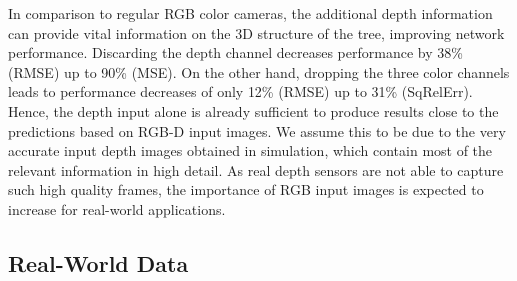 In comparison to regular RGB color cameras, the additional depth information can provide vital information on the 3D structure of the tree, improving network performance.
Discarding the depth channel decreases performance by 38\% (RMSE) up to 90\% (MSE). On the other hand, dropping the three color channels leads to performance decreases of only 12\% (RMSE) up to 31\% (SqRelErr). Hence, the depth input alone is already sufficient to produce results close to the predictions based on RGB-D input images. We assume this to be due to the very accurate input depth images obtained in simulation, which contain most of the relevant information in high detail. As real depth sensors are not able to capture such high quality frames, the importance of RGB input images is expected to increase for real-world applications.


\vspace{-0.2em}
\subsection{Real-World Data} %
\label{sec:real_world_results}

